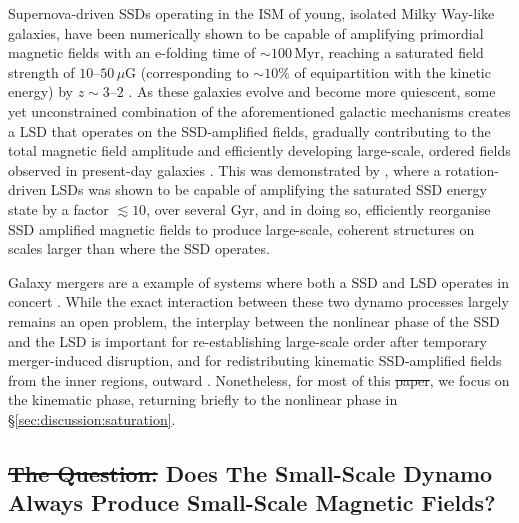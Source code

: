 \documentclass[12pt,twoside]{extreport}
\makeatletter
\providecommand{\DIFaddtex}[1]{{\protect\color{DIFgreen}\uwave{#1}}} %
\providecommand{\DIFdeltex}[1]{{\protect\color{DIFpurple}\sout{#1}}} %
\providecommand{\DIFaddbegin}{} %
\providecommand{\DIFaddend}{} %
\providecommand{\DIFdelbegin}{} %
\providecommand{\DIFdelend}{} %
\providecommand{\DIFadd}[1]{\texorpdfstring{\DIFaddtex{#1}}{#1}} %
\providecommand{\DIFdel}[1]{\texorpdfstring{\DIFdeltex{#1}}{}} %
\providecommand{\DIFscaledelfig}{0.5}
\newlength{\DIFdelgraphicswidth} %
\newlength{\DIFdelgraphicsheight} %
\providecommand{\DIFaddincludegraphics}[2][]{{\color{DIFgreen}\fbox{\DIFOincludegraphics[#1]{#2}}}} %
\providecommand{\DIFdelincludegraphics}[2][]{%
\sbox{\DIFdelgraphicsbox}{\DIFOincludegraphics[#1]{#2}}%
\settoboxwidth{\DIFdelgraphicswidth}{\DIFdelgraphicsbox} %
\settoboxtotalheight{\DIFdelgraphicsheight}{\DIFdelgraphicsbox} %
\scalebox{\DIFscaledelfig}{%
\parbox[b]{\DIFdelgraphicswidth}{\usebox{\DIFdelgraphicsbox}\\[-\baselineskip] \rule{\DIFdelgraphicswidth}{0em}}\llap{\resizebox{\DIFdelgraphicswidth}{\DIFdelgraphicsheight}{%
\setlength{\unitlength}{\DIFdelgraphicswidth}%
\begin{picture}(1,1)%
\thicklines\linethickness{2pt} %
{\color{DIFpurple}\put(0,0){\framebox(1,1){}}}%
{\color{DIFpurple}\put(0,0){\line( 1,1){1}}}%
{\color{DIFpurple}\put(0,1){\line(1,-1){1}}}%
\end{picture}%
}\hspace*{3pt}}} %
} %
\DeclareRobustCommand{\DIFaddbegin}{\DIFOaddbegin \let\includegraphics\DIFaddincludegraphics} %
\DeclareRobustCommand{\DIFaddend}{\DIFOaddend \let\includegraphics\DIFOincludegraphics} %
\DeclareRobustCommand{\DIFdelbegin}{\DIFOdelbegin \let\includegraphics\DIFdelincludegraphics} %
\DeclareRobustCommand{\DIFdelend}{\DIFOaddend \let\includegraphics\DIFOincludegraphics} %
\let\sout@orig\sout %
\renewcommand{\sout}[1]{\ifmmode\text{\sout@orig{\ensuremath{#1}}}\else\sout@orig{#1}\fi} %
\makeatother
\begin{document}
Supernova-driven SSDs operating in the ISM of young, isolated Milky Way-like galaxies, have been numerically shown to be capable of amplifying primordial magnetic fields with an e-folding time of $\sim 100\,\mathrm{Myr}$, reaching a saturated field strength of $10$--$50 \,\mu\mathrm{G}$ (corresponding to $\sim 10\%$ of equipartition with the kinetic energy) by $z \sim 3$--$2$ \citep{pakmor2017magnetic, rieder2016dynamo1, rieder2017dynamo2, steinwandel2023towards, Muni2024_seed_field_to_dynamo}. As these galaxies evolve and become more quiescent, some yet unconstrained combination of the aforementioned galactic mechanisms creates a LSD that operates on the SSD-amplified fields, gradually contributing to the total magnetic field amplitude and efficiently developing large-scale, ordered fields observed in present-day galaxies \citep{rieder2017dynamo2, gent2023transition, brandenburg2023galactic}. This was demonstrated by \citet{gent2023transition}, where a rotation-driven LSDs was shown to be capable of amplifying the saturated SSD energy state by a factor $\lesssim 10$, over several $\mathrm{Gyr}$, and in doing so, efficiently reorganise SSD amplified magnetic fields to produce large-scale, coherent structures on scales larger than where the SSD operates.

Galaxy mergers are a example of systems where both a SSD and LSD operates in concert \citep{berlok2019impact, pfrommer2022simulating}. While the exact interaction between these two dynamo processes largely remains an open problem, the interplay between the nonlinear phase of the SSD and the LSD is important for re-establishing large-scale order after temporary merger-induced disruption, and for redistributing kinematic SSD-amplified fields from the inner regions, outward \citep{whittingham2021impact, whittingham2023impact}. Nonetheless, for most of this \DIFdelbegin \DIFdel{paper}\DIFdelend \DIFaddbegin \DIFadd{chapter}\DIFaddend , we focus on the kinematic phase, returning briefly to the nonlinear phase in \S\ref{sec:discussion:saturation}.

\subsection{\DIFdelbegin \DIFdel{The Question: }\DIFdelend Does The Small-Scale Dynamo Always Produce Small-Scale Magnetic Fields?}
\end{document}
